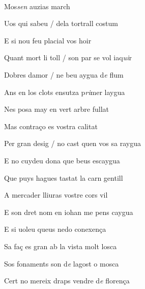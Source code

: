 \documentclass[12pt]{article}
\renewcommand{\espaiAbansEtiquetaPoema}{\vspace{0ex}}
\begin{document}
\begin{estrofa}

\espaiAbansEtiquetaPoema

\\

\begin{rubrica}

\pagina{[85v]} Mos\textit{sen} auzias march

\end{rubrica}

\end{estrofa}


\begin{estrofa}

 Uos qui sabeu / dela tortrall costum

 E si nou feu placial vos hoir

 Quant mort li toll / son par se vol iaq\textit{ui}r

 Dobres damor / ne beu aygua d\textit{e} flum

 Ans en los clots ensutza p\textit{ri}mer laygua

 Nes posa may en vert arbre fullat

 Mas contra\c{c}o es vostra calitat

 Per gran desig / no cast quen vos sa raygua

\end{estrofa}



\begin{estrofa}

 E no cuydeu dona que beus escaygua

 Que puys hagues tastat la carn gentill

 A mercader lliuras vostre cors vil

 E son dret nom en iohan me pens caygua

 E si uoleu queus nedo conexen\c{c}a

 Sa fa\c{c} es gran ab la vista molt losca

 Sos fonaments son d\textit{e} lagost o mosca

 Cert no mereix draps vendre d\textit{e} floren\c{c}a

\end{estrofa}
\end{document}
